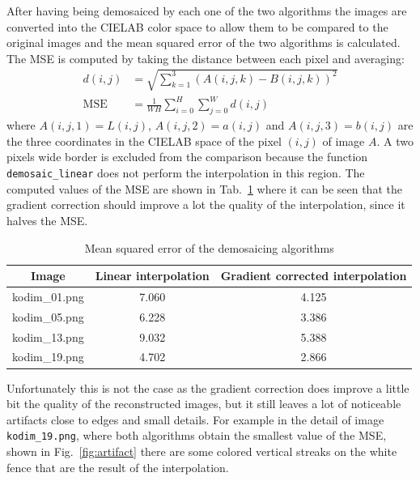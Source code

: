 \documentclass{article}
\newcommand{\inlinecode}[1]{\lstinline[basicstyle=\ttfamily,keywordstyle={}]{#1}}
\begin{document}
After having being demosaiced by each one of the two algorithms the
images are converted into the CIELAB color space to allow them to be
compared to the original images and the mean squared error of the two
algorithms is calculated. The MSE is computed by taking the distance
between each pixel and averaging:
\begin{align*}
  d(i,j) &= \sqrt{\sum_{k=1}^3 \left(A(i,j,k) - B(i,j,k)\right)^2 } \\
  \text{MSE} &= \frac{1}{WH}\sum_{i=0}^H\sum_{j=0}^Wd(i,j)
\end{align*}
where $A(i,j,1) = L(i,j)$, $A(i,j,2) = a(i,j)$ and $A(i,j,3) = b(i,j)$
are the three coordinates in the CIELAB space of the pixel $(i,j)$ of
image $A$. A two pixels wide border is excluded from the comparison
because the function \inlinecode{demosaic_linear} does not perform the
interpolation in this region.  The computed values of the MSE are
shown in Tab.~\ref{tab:mse} where it can be seen that the gradient
correction should improve a lot the quality of the interpolation,
since it halves the MSE.
\begin{table}[h]
  \centering
  \begin{tabular}{ccc}
    Image & Linear interpolation & Gradient corrected interpolation \\
    \hline
    kodim\_01.png & 7.060 & 4.125 \\
    kodim\_05.png & 6.228 & 3.386 \\
    kodim\_13.png & 9.032 & 5.388 \\
    kodim\_19.png & 4.702 & 2.866
  \end{tabular}
  \caption{Mean squared error of the demosaicing algorithms}
  \label{tab:mse}
\end{table}
Unfortunately this is not the case as the gradient correction does
improve a little bit the quality of the reconstructed images, but it
still leaves a lot of noticeable artifacts close to edges and small
details. For example in the detail of image \inlinecode{kodim_19.png},
where both algorithms obtain the smallest value of the MSE, shown in
Fig.~\ref{fig:artifact} there are some colored vertical streaks on the
white fence that are the result of the interpolation.
\end{document}
